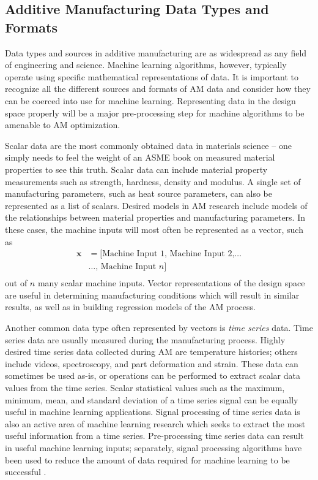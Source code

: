 \subsection{Additive Manufacturing Data Types and Formats}
Data types and sources in additive manufacturing are as widespread as any field of engineering and science. Machine learning algorithms, however, typically operate using specific mathematical representations of data. It is important to recognize all the different sources and formats of AM data and consider how they can be coerced into use for machine learning. Representing data in the design space properly will be a major pre-processing step for machine algorithms to be amenable to AM optimization.

Scalar data are the most commonly obtained data in materials science -- one simply needs to feel the weight of an ASME book on measured material properties to see this truth. Scalar data can include material property measurements such as strength, hardness, density and modulus. A single set of manufacturing parameters, such as heat source parameters, can also be represented as a list of scalars. Desired models in AM research include models of the relationships between material properties and manufacturing parameters. In these cases, the machine inputs will most often be represented as a vector, such as
\begin{equation}
\begin{split}
	\mathbf{x} & = \text{[} \text{Machine Input 1, Machine Input 2,} \hdots  \\
		& \hdots \text{, Machine Input } n \text{]} \\
	\label{vector}
\end{split}
\end{equation}
out of $n$ many scalar machine inputs. Vector representations of the design space are useful in determining manufacturing conditions which will result in similar results, as well as in building regression models of the AM process.


Another common data type often represented by vectors is \textit{time series} data. Time series data are usually measured during the manufacturing process. Highly desired time series data collected during AM are temperature histories; others include videos, spectroscopy, and part deformation and strain. These data can sometimes be used as-is, or operations can be performed to extract scalar data values from the time series. Scalar statistical values such as the maximum, minimum, mean, and standard deviation of a time series signal can be equally useful in machine learning applications. Signal processing of time series data is also an active area of machine learning research which seeks to extract the most useful information from a time series. Pre-processing time series data can result in useful machine learning inputs; separately, signal processing algorithms have been used to reduce the amount of data required for machine learning to be successful \cite{Candes2008}.

